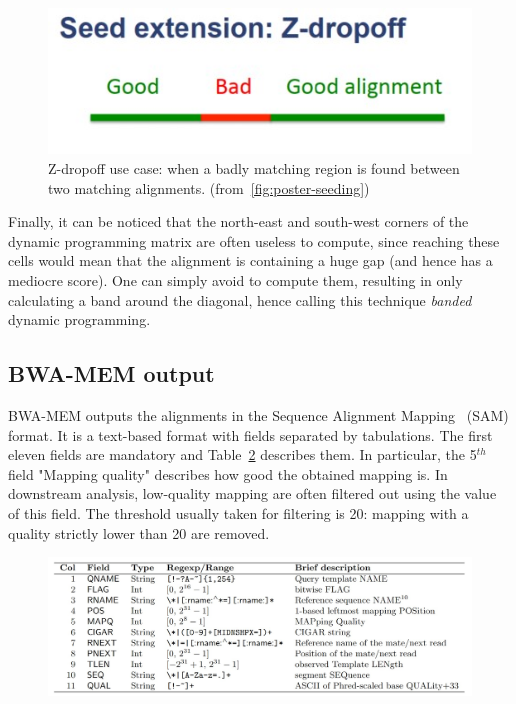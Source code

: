 \begin{figure}[h!]
    \centering
    \includegraphics[width=0.6\linewidth]{zdrop}
    \caption{Z-dropoff use case: when a badly matching region is found between two matching alignments. (from~\ref{fig:poster-seeding})}
    \label{fig:zdrop}
\end{figure}{}

Finally, it can be noticed that the north-east and south-west corners of the dynamic programming matrix are often useless to compute, since reaching these cells would mean that the alignment is containing a huge gap (and hence has a mediocre score). One can simply avoid to compute them, resulting in only calculating a band around the diagonal, hence calling this technique \emph{banded} dynamic programming.

\subsection{BWA-MEM output}

BWA-MEM outputs the alignments in the Sequence Alignment Mapping~\cite{samtools:sam} (SAM) format. It is a text-based format with fields separated by tabulations. The first eleven fields are mandatory and Table~\ref{tab:samformat} describes them. In particular, the 5$^{th}$ field "Mapping quality" describes how good the obtained mapping is. In downstream analysis, low-quality mapping are often filtered out using the value of this field. The threshold usually taken for filtering is 20: mapping with a quality strictly lower than 20 are removed.

\begin{figure}[h!]
    \centering
    \includegraphics[width=1\linewidth]{samformat}
    \label{tab:samformat}
\end{figure}{}

